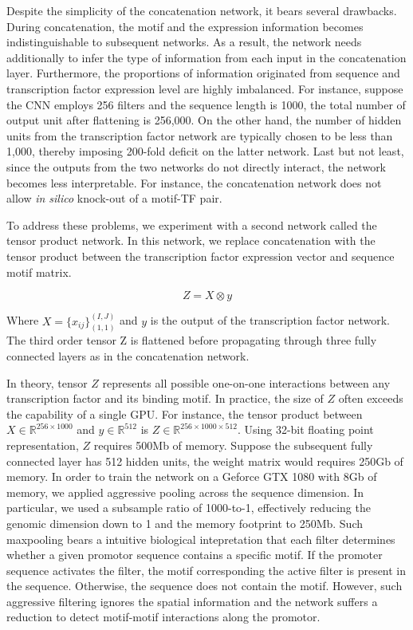 \documentclass{article}
\begin{document}
Despite the simplicity of the concatenation network, it bears several drawbacks. During concatenation, the motif and the expression information becomes indistinguishable to subsequent networks. As a result, the network needs additionally to infer the type of information from each input in the concatenation layer. Furthermore, the proportions of information originated from sequence and transcription factor expression level are highly imbalanced. For instance, suppose the CNN employs 256 filters and the sequence length is 1000, the total number of output unit after flattening is 256,000. On the other hand, the number of hidden units from the transcription factor network are typically chosen to be less than 1,000, thereby imposing 200-fold deficit on the latter network. Last but not least, since the outputs from the two networks do not directly interact, the network becomes less interpretable. For instance, the concatenation network does not allow \textit{in silico} knock-out of a motif-TF pair. 

To address these problems, we experiment with a second network called the tensor product network. In this network, we replace concatenation with the tensor product between the transcription factor expression vector and sequence motif matrix. 

\begin{equation}
Z = X \otimes y
\end{equation}

Where $X=\{x_{ij}\}_{(1,1)}^{(I,J)}$ and $y$ is the output of the transcription factor network. The third order tensor Z is flattened before propagating through three fully connected layers as in the concatenation network. 

In theory, tensor $Z$ represents all possible one-on-one interactions between any transcription factor and its binding motif. In practice, the size of $Z$ often exceeds the capability of a single GPU. For instance, the tensor product between $X \in \mathbb{R}^{256 \times 1000}$ and $y \in \mathbb{R}^{512}$ is $Z \in \mathbb{R}^{256 \times 1000 \times 512}$. Using 32-bit floating point representation, $Z$ requires 500Mb of memory. Suppose the subsequent fully connected layer has 512 hidden units, the weight matrix would requires 250Gb of memory. In order to train the network on a Geforce GTX 1080 with 8Gb of memory, we applied aggressive pooling across the sequence dimension. In particular, we used a subsample ratio of 1000-to-1, effectively reducing the genomic dimension down to 1 and the memory footprint to 250Mb. Such maxpooling bears a intuitive biological intepretation that each filter determines whether a given promotor sequence contains a specific motif. If the promoter sequence activates the filter, the motif corresponding the active filter is present in the sequence. Otherwise, the sequence does not contain the motif. However, such aggressive filtering ignores the spatial information and the network suffers a reduction to detect motif-motif interactions along the promotor. 
\end{document}
